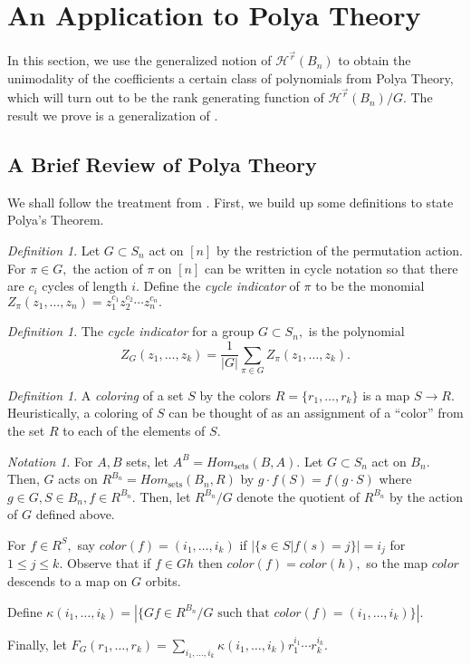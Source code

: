 \documentclass[10 pt]{amsart}
\theoremstyle{plain}
\theoremstyle{definition}
\theoremstyle{remark}
\numberwithin{equation}{section}
\theoremstyle{remark}
\newtheorem{defn}[thm]{Definition}
\newtheorem{note}[thm]{Notation}
\newcommand\ssec{\subsection}
\renewcommand{\vec}[1]{\overrightarrow{#1}}
\begin{document}
\section{An Application to Polya Theory}
\label{sec:polya}
In this section, we use the generalized notion of $\mathcal H^{\vec r}(B_n)$ to obtain the unimodality of the coefficients a certain class of polynomials from Polya Theory, which will turn out to be the rank generating function of $\mathcal H^{\vec r}(B_n)/G.$ The result we prove is a generalization of \cite[Corollary 7.16]{algebraic_stanley}. 

\ssec{A Brief Review of Polya Theory}

We shall follow the treatment from \cite[Chapter 7]{algebraic_stanley}. First, we build up some definitions to state Polya's Theorem.

\begin{defn}
Let $G \subset S_n$ act on $[n]$ by the restriction of the permutation action. For $\pi \in G,$ the action of $\pi$ on $[n]$ can be written in cycle notation so that there are $c_i$ cycles of length $i.$ Define the {\it cycle indicator} of $\pi$ to be the monomial $Z_\pi(z_1,\ldots, z_n) = z_1^{c_1}z_2^{c_2}\cdots z_n^{c_n}.$
\end{defn}

\begin{defn}
The {\it cycle indicator} for a group $G \subset S_n,$ is the polynomial $$Z_G(z_1,\ldots, z_k) = \frac{1}{|G|}\sum_{\pi \in G} Z_\pi(z_1,\ldots, z_k).$$
\end{defn}

\begin{defn}
A {\it coloring} of a set $S$ by the colors $R = \{r_1,\ldots, r_k\}$ is a map $S \rightarrow R.$ Heuristically, a coloring of $S$ can be thought of as an assignment of a ``color'' from the set $R$ to each of the elements of $S.$
\end{defn}

\begin{note}
For $A,B$ sets, let $A^B = Hom_{\text{sets}}(B,A).$ Let $G \subset S_n$ act on $B_n.$ Then, $G$ acts on $R^{B_n} = Hom_{\text{sets}}(B_n,R)$ by $g \cdot f(S) = f(g\cdot S)$ where $g \in G,S \in B_n, f \in R^{B_n}.$ Then, let $R^{B_n}/G$ denote the quotient of $R^{B_n}$ by the action of $G$ defined above.

For $f \in R^{S},$ say $color(f) = (i_1,\ldots, i_k)$ if $|\{s \in S|f(s) = j\}| = i_j$ for $1 \leq j \leq k.$ Observe that if $f \in Gh$ then $color(f) = color(h),$ so the map $color$ descends to a map on $G$ orbits.

Define $\kappa(i_1,\ldots, i_k) = |\{Gf \in R^{B_n}/G \text{ such that } color(f) = (i_1,\ldots, i_k) \}|.$

Finally, let $F_G(r_1,\ldots, r_k) = \sum_{i_1,\ldots, i_k} \kappa(i_1,\ldots, i_k)r_1^{i_1} \cdots r_k^{i_k}.$
\end{note}
\end{document}
